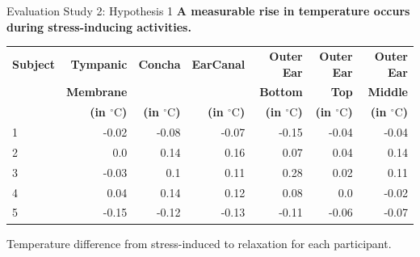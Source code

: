 \documentclass[en]{sdqbeamer}
\begin{document}
\begin{frame}{Evaluation Study 2: Hypothesis 1}
    \textbf{A measurable rise in temperature occurs during stress-inducing activities.}

    \begin{center}
        \begin{tabularx}{\textwidth}{|X|rrrrrr|}
        \hline
        \textbf{Subject} & \textbf{Tympanic} & \textbf{Concha} & \textbf{EarCanal} & \textbf{Outer Ear} & \textbf{Outer Ear} & \textbf{Outer Ear} \\
             & \textbf{Membrane} &  &  & \textbf{Bottom} & \textbf{Top} & \textbf{Middle} \\   
             &\textbf{(in \(^\circ\text{C}\))} & \textbf{(in \(^\circ\text{C}\))} & \textbf{(in \(^\circ\text{C}\))} & \textbf{(in \(^\circ\text{C}\))} & \textbf{(in \(^\circ\text{C}\))} & \textbf{(in \(^\circ\text{C}\))} \\
        \hline
        1 & -0.02 & -0.08 & -0.07 & -0.15 & -0.04 & -0.04 \\
        2 & 0.0 & 0.14 & 0.16 & 0.07 & 0.04 & 0.14 \\
        3 & -0.03 & 0.1 & 0.11 & 0.28 & 0.02 & 0.11 \\
        4 & 0.04 & 0.14 & 0.12 & 0.08 & 0.0 & -0.02 \\
        5 & -0.15 & -0.12 & -0.13 & -0.11 & -0.06 & -0.07 \\
        \hline
        \end{tabularx}
    \end{center}
    
    Temperature difference from stress-induced to relaxation for each participant.
\end{frame}
\end{document}
